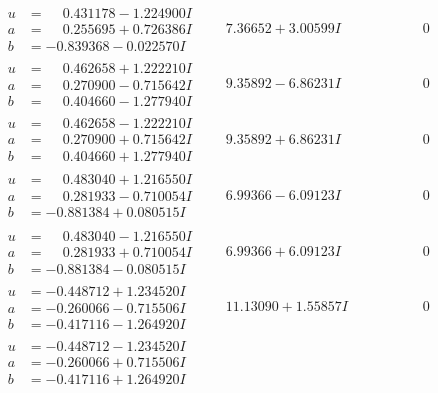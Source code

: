 \documentclass[1p]{elsarticle_modified}
\theoremstyle{definition}
\begin{document}
$$\begin{array}{c|c|c}
\begin{aligned}
u &= \phantom{-}0.431178 - 1.224900 I \\
a &= \phantom{-}0.255695 + 0.726386 I \\
b &= -0.839368 - 0.022570 I\end{aligned}
 & \phantom{-}7.36652 + 3.00599 I & \phantom{-0.000000 } 0 \\ \hline\begin{aligned}
u &= \phantom{-}0.462658 + 1.222210 I \\
a &= \phantom{-}0.270900 - 0.715642 I \\
b &= \phantom{-}0.404660 - 1.277940 I\end{aligned}
 & \phantom{-}9.35892 - 6.86231 I & \phantom{-0.000000 } 0 \\ \hline\begin{aligned}
u &= \phantom{-}0.462658 - 1.222210 I \\
a &= \phantom{-}0.270900 + 0.715642 I \\
b &= \phantom{-}0.404660 + 1.277940 I\end{aligned}
 & \phantom{-}9.35892 + 6.86231 I & \phantom{-0.000000 } 0 \\ \hline\begin{aligned}
u &= \phantom{-}0.483040 + 1.216550 I \\
a &= \phantom{-}0.281933 - 0.710054 I \\
b &= -0.881384 + 0.080515 I\end{aligned}
 & \phantom{-}6.99366 - 6.09123 I & \phantom{-0.000000 } 0 \\ \hline\begin{aligned}
u &= \phantom{-}0.483040 - 1.216550 I \\
a &= \phantom{-}0.281933 + 0.710054 I \\
b &= -0.881384 - 0.080515 I\end{aligned}
 & \phantom{-}6.99366 + 6.09123 I & \phantom{-0.000000 } 0 \\ \hline\begin{aligned}
u &= -0.448712 + 1.234520 I \\
a &= -0.260066 - 0.715506 I \\
b &= -0.417116 - 1.264920 I\end{aligned}
 & \phantom{-}11.13090 + 1.55857 I & \phantom{-0.000000 } 0 \\ \hline\begin{aligned}
u &= -0.448712 - 1.234520 I \\
a &= -0.260066 + 0.715506 I \\
b &= -0.417116 + 1.264920 I\end{aligned}

\end{array}$$
\end{document}

